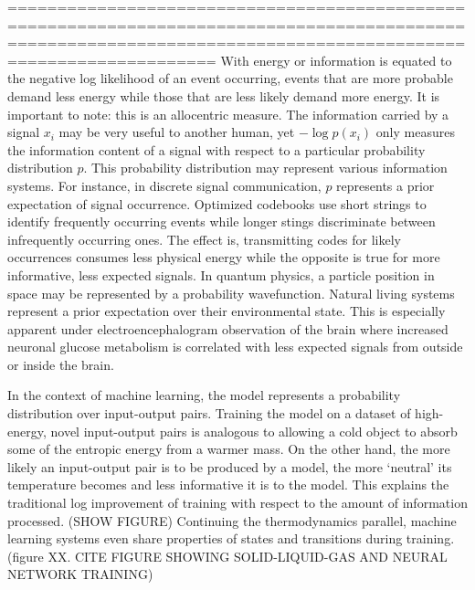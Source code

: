 








    

===============================================================================================================================================================
With energy or information is equated to the negative log likelihood of an event occurring, events that are more probable demand less energy while those that are less likely demand more energy. It is important to note: this is an allocentric measure. The information carried by a signal $x_i$ may be very useful to another human, yet $- \log{p(x_i)}$ only measures the information content of a signal with respect to a particular probability distribution $p$. This probability distribution may represent various information systems. For instance, in discrete signal communication, $p$ represents a prior expectation of signal occurrence. Optimized codebooks use short strings to identify frequently occurring events while longer stings discriminate between infrequently occurring ones. The effect is, transmitting codes for likely occurrences consumes less physical energy while the opposite is true for more informative, less expected signals. In quantum physics, a particle position in space may be represented by a probability wavefunction. Natural living systems represent a prior expectation over their environmental state. 
This is especially apparent under electroencephalogram observation of the brain where increased neuronal glucose metabolism is correlated with less expected signals from outside or inside the brain. 

In the context of machine learning, the model represents a probability distribution over input-output pairs. Training the model on a dataset of high-energy, novel input-output pairs is analogous to allowing a cold object to absorb some of the entropic energy from a warmer mass. On the other hand, the more likely an input-output pair is to be produced by a model, the more ‘neutral’ its temperature becomes and less informative it is to the model. This explains the traditional log improvement of training with respect to the amount of information processed. (SHOW FIGURE) Continuing the thermodynamics parallel, machine learning systems even share properties of states and transitions during training. (figure XX. CITE FIGURE SHOWING SOLID-LIQUID-GAS AND NEURAL NETWORK TRAINING)

